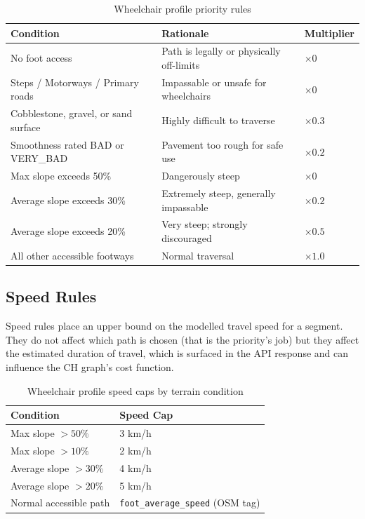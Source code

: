 \documentclass[12pt, a4paper]{report}
\begin{document}
\begin{table}[H]
\centering
\caption{Wheelchair profile priority rules}
\label{tab:priority}
\begin{tabularx}{\textwidth}{@{}lXl@{}}
\toprule
\textbf{Condition} & \textbf{Rationale} & \textbf{Multiplier} \\
\midrule
No foot access & Path is legally or physically off-limits & $\times 0$ \\
Steps / Motorways / Primary roads & Impassable or unsafe for wheelchairs & $\times 0$ \\
Cobblestone, gravel, or sand surface & Highly difficult to traverse & $\times 0.3$ \\
Smoothness rated BAD or VERY\_BAD & Pavement too rough for safe use & $\times 0.2$ \\
Max slope exceeds 50\% & Dangerously steep & $\times 0$ \\
Average slope exceeds 30\% & Extremely steep, generally impassable & $\times 0.2$ \\
Average slope exceeds 20\% & Very steep; strongly discouraged & $\times 0.5$ \\
All other accessible footways & Normal traversal & $\times 1.0$ \\
\bottomrule
\end{tabularx}
\end{table}

\subsection{Speed Rules}
\label{subsec:speed}

Speed rules place an upper bound on the modelled travel speed for a segment. They do not affect which path is chosen (that is the priority's job) but they affect the estimated duration of travel, which is surfaced in the API response and can influence the CH graph's cost function.

\begin{table}[H]
\centering
\caption{Wheelchair profile speed caps by terrain condition}
\begin{tabular}{@{}ll@{}}
\toprule
\textbf{Condition} & \textbf{Speed Cap} \\
\midrule
Max slope $> 50\%$ & 3 km/h \\
Max slope $> 10\%$ & 2 km/h \\
Average slope $> 30\%$ & 4 km/h \\
Average slope $> 20\%$ & 5 km/h \\
Normal accessible path & \texttt{foot\_average\_speed} (OSM tag) \\
\bottomrule
\end{tabular}
\end{table}
\end{document}
